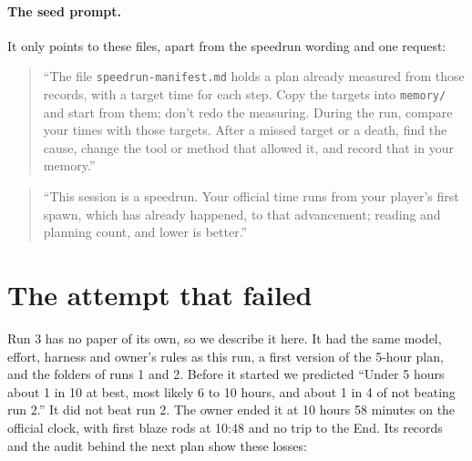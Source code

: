 \documentclass[11pt,a4paper]{article}
\begin{document}
\paragraph{The seed prompt.} It only points to these files, apart from the speedrun wording and one request:

\begin{quote}
``The file \texttt{speedrun-manifest.md} holds a plan already measured from those records, with a target time for each step. Copy the targets into \texttt{memory/} and start from them; don't redo the measuring. During the run, compare your times with those targets. After a missed target or a death, find the cause, change the tool or method that allowed it, and record that in your memory.''
\end{quote}

\begin{quote}
``This session is a speedrun. Your official time runs from your player's first spawn, which has already happened, to that advancement; reading and planning count, and lower is better.''
\end{quote}

\section{The attempt that failed}
\label{sec:run3}

Run 3 has no paper of its own, so we describe it here. It had the same model, effort, harness and owner's rules as this run, a first version of the 5-hour plan, and the folders of runs 1 and 2. Before it started we predicted ``Under 5 hours about 1 in 10 at best, most likely 6 to 10 hours, and about 1 in 4 of not beating run 2.'' It did not beat run 2. The owner ended it at 10 hours 58 minutes on the official clock, with first blaze rods at 10:48 and no trip to the End. Its records and the audit behind the next plan show these losses:
\end{document}
